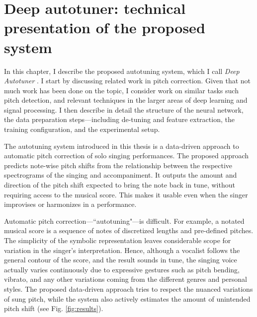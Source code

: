 \chapter{Deep autotuner: technical presentation of the proposed system}
\label{chap:thesis-autotuner}
In this chapter, I describe the proposed autotuning system, which I call \textit{Deep Autotuner} \cite{wager2020deep}. I start by discussing related work in pitch correction. Given that not much work has been done on the topic, I consider work on similar tasks such pitch detection, and relevant techniques in the larger areas of deep learning and signal processing. I then describe in detail the structure of the neural network, the data preparation steps---including de-tuning and feature extraction, the training configuration, and the experimental setup. 


The autotuning system introduced in this thesis is a data-driven approach to automatic pitch correction of solo singing performances. The proposed approach predicts note-wise pitch shifts from the relationship between the respective spectrograms of the singing and accompaniment. It outputs the amount and direction of the pitch shift expected to bring the note back in tune, without requiring access to the musical score. This makes it usable even when the singer improvises or harmonizes in a performance.

Automatic pitch correction---``autotuning"---is difficult. For example, a notated musical score is a sequence of notes of discretized lengths and pre-defined pitches. The simplicity of the symbolic representation leaves considerable scope for variation in the singer's interpretation. Hence, although a vocalist follows the general contour of the score, and the result sounds in tune, the singing voice actually varies continuously due to expressive gestures such as pitch bending, vibrato, and any other variations coming from the different genres and personal styles. The proposed data-driven approach tries to respect the nuanced variations of sung pitch, while the system also actively estimates the amount of unintended pitch shift (see Fig. \ref{fig:results}).

